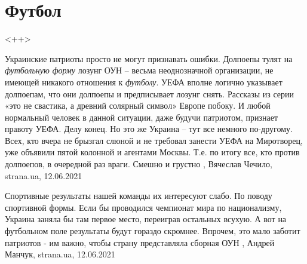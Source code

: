  
 
 
 
 
\chapter{Футбол}

  <++>

Украинские патриоты просто не могут признавать ошибки.  Долпоепы тулят на
\emph{футбольную форму} лозунг ОУН – весьма неоднозначной организации, не имеющей
никакого отношения к \emph{футболу}. УЕФА вполне логично указывает долпоепам, что они
долпоепы и предписывает лозунг снять. Рассказы из серии «это не свастика, а
древний солярный символ» Европе побоку. И любой нормальный человек в данной
ситуации, даже будучи патриотом, признает правоту УЕФА. Делу конец.  Но это же
Украина – тут все немного по-другому. Всех, кто вчера не брызгал слюной и не
требовал занести УЕФА на Миротворец, уже объявили пятой колонной и агентами
Москвы. Т.е. по итогу все, кто против долпоепов, в очередной раз враги. Смешно
и грустно
, 
Вячеслав Чечило, strana.ua, 12.06.2021

Спортивные результаты нашей команды их интересуют слабо. По поводу спортивной
формы. Если бы проводился чемпионат мира по национализму, Украина заняла бы
там первое место, переиграв остальных всухую. А вот на футбольном поле
результаты будут гораздо скромнее.  Впрочем, это мало заботит патриотов - им
важно, чтобы страну представляла сборная ОУН
, 
Андрей Манчук, strana.ua, 12.06.2021

